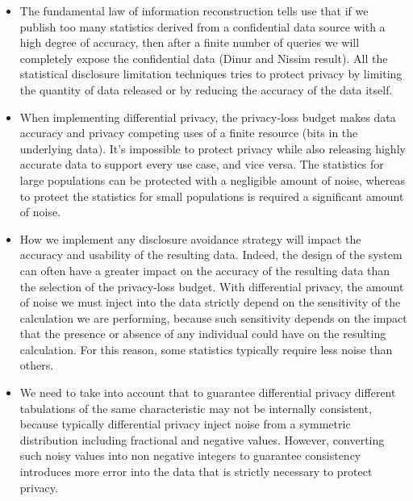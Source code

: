 \begin{itemize}
\item The fundamental law of information reconstruction tells use that if we publish too many statistics derived from a confidential data source with a high degree of accuracy, then after a finite number of queries we will completely expose the confidential data (Dinur and Nissim result). All the statistical disclosure limitation techniques tries to protect privacy by limiting the quantity of data released or by reducing the accuracy of the data itself.
\item When implementing differential privacy, the privacy-loss budget makes data accuracy and privacy competing uses of a finite resource (bits in the underlying data). It's impossible to protect privacy while also releasing highly accurate data to support every use case, and vice versa. The statistics for large populations can be protected with a negligible amount of noise, whereas to protect the statistics for small populations is required a significant amount of noise.
\item How we implement any disclosure avoidance strategy will impact the accuracy and usability of the resulting data. Indeed, the design of the system can often have a greater impact on the accuracy of the resulting data than the selection of the privacy-loss budget. With differential privacy, the amount of noise we must inject into the data strictly depend on the sensitivity of the calculation we are performing, because such sensitivity depends on the impact that the presence or absence of any individual could have on the resulting calculation. For this reason, some statistics typically require less noise than others.
\item We need to take into account that to guarantee differential privacy different tabulations of the same characteristic may not be internally consistent, because typically differential privacy inject noise from a symmetric distribution including fractional and negative values. However, converting such noisy values into non negative integers to guarantee consistency introduces more error into the data that is strictly necessary to protect privacy.
\end{itemize}

